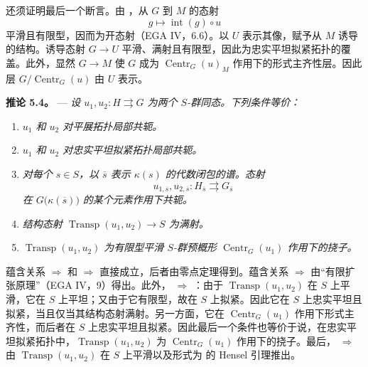 还须证明最后一个断言。由 ，从 \(G\) 到 \(M\) 的态射  \[
  g\longmapsto\operatorname{int}(g)\circ u
\] 平滑且有限型，因而为开态射（EGA IV，6.6）。以 \(U\) 表示其像，赋予从 \(M\) 诱导的结构。诱导态射 \(G\to U\) 平滑、满射且有限型，因此为忠实平坦拟紧拓扑的覆盖。此外，显然  \(G\to M\) 使 \(G\) 成为 \(\operatorname{Centr}_G(u)_M\) 作用下的形式主齐性层。因此层 \(G/\operatorname{Centr}_G(u)\) 由 \(U\) 表示。

\medskip\noindent{}\textbf{推论 5.4。} --- \textit{设 \(u_1,u_2:H\rightrightarrows G\) 为两个 \(S\)-群同态。下列条件等价：}

\begin{enumerate}\item[(i)]\textit{\(u_1\) 和 \(u_2\) 对平展拓扑局部共轭。}

\item[(i bis)]\textit{\(u_1\) 和 \(u_2\) 对忠实平坦拟紧拓扑局部共轭。}

\item[(ii)]\textit{对每个 \(s\in S\)，以 \(\overline{s}\) 表示 \(\kappa(s)\) 的代数闭包的谱。态射 \[
  u_{1,\overline{s}},u_{2,\overline{s}}:
  H_{\overline{s}}\rightrightarrows G_{\overline{s}}
\] 在 \(G\bigl(\kappa(\overline{s})\bigr)\) 的某个元素作用下共轭。}

\item[(ii bis)]\textit{结构态射 \(\operatorname{Transp}(u_1,u_2)\to S\) 为满射。}

\item[(iii)]\textit{\(\operatorname{Transp}(u_1,u_2)\) 为有限型平滑 \(S\)-群预概形 \(\operatorname{Centr}_G(u_1)\) 作用下的挠子。}\end{enumerate}

蕴含关系  \(\Rightarrow\)  和  \(\Rightarrow\)  直接成立，后者由零点定理得到。蕴含关系  \(\Rightarrow\)  由“有限扩张原理”（EGA IV，9）得出。此外， \(\Rightarrow\) ：由于 \(\operatorname{Transp}(u_1,u_2)\) 在 \(S\) 上平滑，它在 \(S\) 上平坦；又由于它有限型，故在 \(S\) 上拟紧。因此它在 \(S\) 上忠实平坦且拟紧，当且仅当其结构态射满射。另一方面，它在 \(\operatorname{Centr}_G(u_1)\) 作用下形式主齐性，而后者在 \(S\) 上忠实平坦且拟紧。因此最后一个条件也等价于说，在忠实平坦拟紧拓扑中，\(\operatorname{Transp}(u_1,u_2)\) 为 \(\operatorname{Centr}_G(u_1)\) 作用下的挠子。最后， \(\Rightarrow\)  由 \(\operatorname{Transp}(u_1,u_2)\) 在 \(S\) 上平滑以及形式为  的 Hensel 引理推出。

